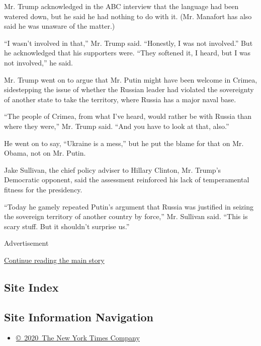 Mr. Trump acknowledged in the ABC interview that the language had been
watered down, but he said he had nothing to do with it. (Mr. Manafort
has also said he was unaware of the matter.)

``I wasn't involved in that,'' Mr. Trump said. ``Honestly, I was not
involved.'' But he acknowledged that his supporters were. ``They
softened it, I heard, but I was not involved,'' he said.

Mr. Trump went on to argue that Mr. Putin might have been welcome in
Crimea, sidestepping the issue of whether the Russian leader had
violated the sovereignty of another state to take the territory, where
Russia has a major naval base.

``The people of Crimea, from what I've heard, would rather be with
Russia than where they were,'' Mr. Trump said. ``And you have to look at
that, also.''

He went on to say, ``Ukraine is a mess,'' but he put the blame for that
on Mr. Obama, not on Mr. Putin.

Jake Sullivan, the chief policy adviser to Hillary Clinton, Mr. Trump's
Democratic opponent, said the assessment reinforced his lack of
temperamental fitness for the presidency.

``Today he gamely repeated Putin's argument that Russia was justified in
seizing the sovereign territory of another country by force,'' Mr.
Sullivan said. ``This is scary stuff. But it shouldn't surprise us.''

Advertisement

\protect\hyperlink{after-bottom}{Continue reading the main story}

\hypertarget{site-index}{%
\subsection{Site Index}\label{site-index}}

\hypertarget{site-information-navigation}{%
\subsection{Site Information
Navigation}\label{site-information-navigation}}

\begin{itemize}
\tightlist
\item
  \href{https://help.nytimes.com/hc/en-us/articles/115014792127-Copyright-notice}{©~2020~The
  New York Times Company}
\end{itemize}

